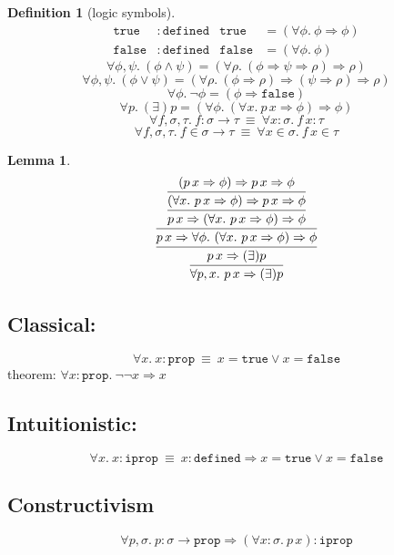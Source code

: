 \documentclass{article}
\newtheorem{definition}{Definition}
\newtheorem{lemma}{Lemma}
\newcommand\imp{\Rightarrow}
\newcommand\defeq{\ \equiv\ }
\newcommand\true{\mathtt{true}}
\newcommand\false{\mathtt{false}}
\newcommand\prop{\mathtt{prop}}
\newcommand\iprop{\mathtt{iprop}}
\newcommand\defined{\mathtt{defined}}
\begin{document}
\begin{definition}[logic symbols]
\begin{align*}
	\true &: \defined&
	\true &= (\forall \phi.\ \phi \imp \phi)\\
	\false &: \defined&
	\false &= (\forall \phi.\ \phi)
\end{align*}
\[
\forall \phi,\psi.\ (\phi \land \psi) = (\forall \rho.\ (\phi \imp \psi \imp \rho) \imp \rho)
\]
\[
\forall \phi,\psi.\ (\phi \lor \psi) = (\forall \rho.\ (\phi \imp \rho) \imp (\psi \imp \rho) \imp \rho)
\]
\[
\forall \phi.\ \neg\phi = (\phi \imp \false)
\]
\[
\forall p.\ (\exists) p = (\forall\phi.\ (\forall x.\ p\,x \imp \phi) \imp \phi)
\]
\[	\forall f,\sigma,\tau.\ f : \sigma \to \tau \defeq \forall x : \sigma.\ f\,x : \tau
\]
\[	\forall f,\sigma,\tau.\ f \in \sigma \to \tau \defeq \forall x \in \sigma.\ f\,x \in \tau
\]
\end{definition}

\begin{lemma}
\[
\infer{\forall p,x.\ p\,x \imp (\exists)p}{
	\infer{p\,x \imp (\exists)p}{
		\infer{p\,x \imp \forall \phi.\ (\forall x.\ p\,x \imp \phi) \imp \phi}{
			\infer{p\,x \imp (\forall x.\ p\,x \imp \phi) \imp \phi}{
				\infer{(\forall x.\ p\,x \imp \phi) \imp p\,x \imp \phi}{
					(p\,x\imp\phi) \imp p\,x \imp \phi
				}
			}
		}
	}
}
\]
\end{lemma}
\subsection{Classical:}
\[
	\forall x.\ x : \prop \defeq x = \true \lor x = \false
\]
theorem:
$\forall x : \prop.\ \neg\neg x \imp x$

\subsection{Intuitionistic:}
\[
	\forall x.\ x : \iprop \defeq x : \defined \imp x = \true \lor x = \false
\]

\subsection{Constructivism}
\[	\forall p,\sigma.\ p : \sigma\to\prop \imp (\forall x : \sigma.\ p\,x) : \iprop
\]
\end{document}
